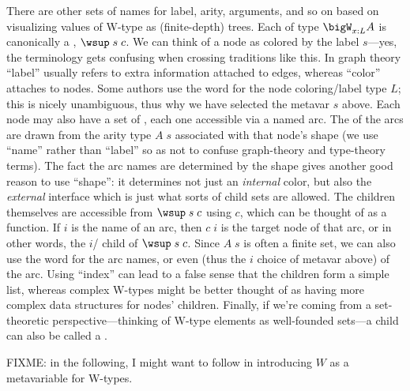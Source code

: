 \documentclass[11pt]{article} %
\theoremstyle{definition}
\theoremstyle{remark}
\begin{document}
There are other sets of names for label, arity, arguments, and so on based on visualizing values of W-type as (finite-depth) trees.
Each  of type $\bigW_{x:L}A$ is canonically a , $\wsup\;s\;c$.
We can think of a node as colored by the label $s$---yes, the terminology gets confusing when crossing traditions like this.
In graph theory ``label'' usually refers to extra information attached to edges, whereas ``color'' attaches to nodes.
Some authors use the word  for the node coloring/label type $L$; this is nicely unambiguous, thus why we have selected the metavar $s$ above.
Each node may also have a set of , each one accessible via a named arc.
The  of the arcs are drawn from the arity type $A\;s$ associated with that node's shape (we use ``name'' rather than ``label'' so as not to confuse graph-theory and type-theory terms).
The fact the arc names are determined by the shape gives another good reason to use ``shape'': it determines not just an \emph{internal} color, but also the \emph{external} interface which is just what sorts of child sets are allowed.
The children themselves are accessible from $\wsup\;s\;c$ using $c$, which can be thought of as a  function.
If $i$ is the name of an arc, then $c\;i$ is the target node of that arc, or in other words, the $i$\supth/ child of $\wsup\;s\;c$.
Since $A\;s$ is often a finite set, we can also use the word  for the arc names, or even  (thus the $i$ choice of metavar above) of the arc.
Using ``index'' can lead to a false sense that the children form a simple list, whereas complex W-types might be better thought of as having more complex data structures for nodes' children.
Finally, if we're coming from a set-theoretic perspective---thinking of W-type elements as well-founded sets---a child can also be called a .

FIXME: in the following, I might want to follow \cite{awodey-etal_2012} in introducing $W$ as a metavariable for W-types.
\end{document}
